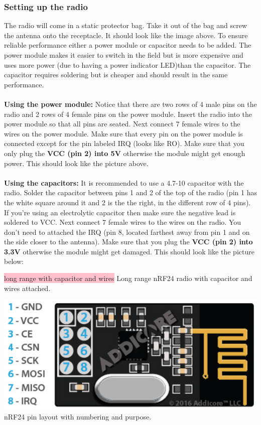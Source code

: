 \documentclass[12pt]{article}
\begin{document}
\subsubsection{Setting up the radio}
The radio will come in a static protector bag.  Take it out of the bag and screw the antenna onto the receptacle.  It should look like the image above.  To ensure reliable performance either a power module or capacitor needs to be added.  The power module makes it easier to switch in the field but is more expensive and uses more power (due to having a power indicator LED)than the capacitor.  The capacitor requires soldering but is cheaper and should result in the same performance.\\\\
\textbf{Using the power module:}
Notice that there are two rows of 4 male pins on the radio and 2 rows of 4 female pins on the power module.  Insert the radio into the power module so that all pins are seated.  Next connect 7 female wires to the wires on the power module.  Make sure that every pin on the power module is connected except for the pin labeled IRQ (looks like RO).  Make sure that you only plug the \textbf{VCC (pin 2) into 5V} otherwise the module might get enough power.  This should look like the picture above.\\\\
\textbf{Using the capacitors:}
It is recommended to use a 4.7-10 capacitor with the radio.  Solder the capacitor between pins 1 and 2 of the top of the radio (pin 1 has the white square around it and 2 is the the right, in the different row of 4 pins).  If you're using an electrolytic capacitor then make sure the negative lead is soldered to VCC.  Next connect 7 female wires to the wires on the radio.  You don't need to attached the IRQ (pin 8, located farthest away from pin 1 and on the side closer to the antenna).  Make sure that you plug the \textbf{VCC (pin 2) into 3.3V} otherwise the module might get damaged.  This should look like the picture below:
\begin{center}
	\colorbox{pink}{long range with capacitor and wires}
	Long range nRF24 radio with capacitor and wires attached.
\end{center}
\begin{center}
	\includegraphics[width=6in]{nRF24_pinout}\\
	nRF24 pin layout with numbering and purpose.
\end{center}
\end{document}
